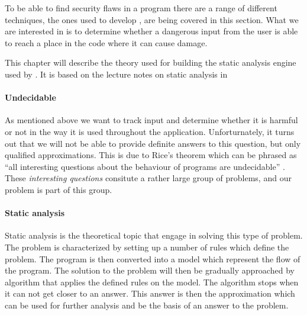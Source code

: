 To be able to find security flaws in a program there are a range of different techniques, the ones used to develop \pyt{}, are being covered in this section.
What we are interested in is to determine whether a dangerous input from the user is able to reach a place in the code where it can cause damage.

This chapter will describe the theory used for building the static analysis engine used by \pyt{}.
It is based on the lecture notes on static analysis in \citet{schwartzbach}


\paragraph{Undecidable}\label{theory_intro}
As mentioned above we want to track input and determine whether it is harmful or not in the way it is used throughout the application.
Unforturnately, it turns out that we will not be able to provide definite answers to this question, but only qualified approximations.
This is due to Rice's theorem which can be phrased as ``all interesting questions about the behaviour of programs are undecidable'' \citep[p.~3]{schwartzbach}.
These \emph{interesting questions} consitute a rather large group of problems, and our problem is part of this group.

\paragraph{Static analysis}
Static analysis is the theoretical topic that engage in solving this type of problem.
The problem is characterized by setting up a number of rules which define the problem.
The program is then converted into a model which represent the flow of the program.
The solution to the problem will then be gradually approached by algorithm that applies the defined rules on the model.
The algorithm stops when it can not get closer to an answer.
This answer is then the approximation which can be used for further analysis and be the basis of an answer to the problem.

